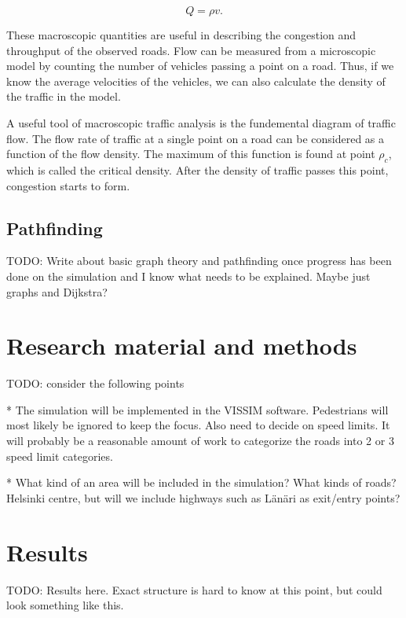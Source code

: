 \documentclass[english, 12pt, a4paper, elec, utf8, pdfa, online]{aaltothesis}
\begin{document}
\[ Q = \rho v .\]

These macroscopic quantities are useful in describing the congestion and throughput of the observed roads. Flow can be measured from a microscopic model by counting the number of vehicles passing a point on a road. Thus, if we know the average velocities of the vehicles, we can also calculate the density of the traffic in the model. \cite{treiber}

A useful tool of macroscopic traffic analysis is the fundemental diagram of traffic flow. The flow rate of traffic at a single point on a road can be considered as a function of the flow density. The maximum of this function is found at point $\rho_c$, which is called the critical density. After the density of traffic passes this point, congestion starts to form.\cite{kerner}

\subsection{Pathfinding}

TODO: Write about basic graph theory and pathfinding once progress has been done on the simulation and I know what needs to be explained. Maybe just graphs and Dijkstra?

\clearpage

\section{Research material and methods}

TODO: consider the following points

* The simulation will be implemented in the VISSIM software. Pedestrians will most likely be ignored to keep the focus. Also need to decide on speed limits. It will probably be a reasonable amount of work to categorize the roads into 2 or 3 speed limit categories.

* What kind of an area will be included in the simulation? What kinds of roads? Helsinki centre, but will we include highways such as Länäri as exit/entry points?

\clearpage

\section{Results}

TODO: Results here. Exact structure is hard to know at this point, but could look something like this.
\end{document}
